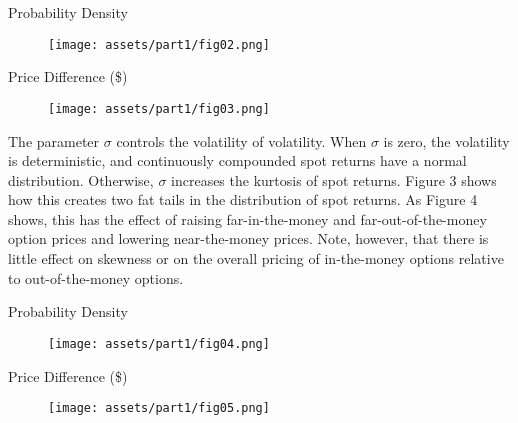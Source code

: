     \begin{frame}{Probability Density}
        \begin{figure}
            \texttt{[image: assets/part1/fig02.png]}
        \end{figure}
    \end{frame}
    
    \begin{frame}{Price Difference (\$)}
        \begin{figure}
            \texttt{[image: assets/part1/fig03.png]}
        \end{figure}
    \end{frame}

    \begin{frame}
        The parameter $\sigma$ controls the volatility of volatility. When $\sigma$ is zero, the volatility is deterministic, and continuously compounded spot returns have a normal distribution. Otherwise, $\sigma$ increases the kurtosis of spot returns. Figure 3 shows how this creates two fat tails in the distribution of spot returns. 
        As Figure 4 shows, this has the effect of raising far-in-the-money and far-out-of-the-money option prices and lowering near-the-money prices. Note, however, that there is little effect on skewness or on the overall pricing of in-the-money options relative to out-of-the-money options.
    \end{frame}

    \begin{frame}{Probability Density}
        \begin{figure}
            \texttt{[image: assets/part1/fig04.png]}
        \end{figure}
    \end{frame}

    \begin{frame}{Price Difference (\$)}
        \begin{figure}
            \texttt{[image: assets/part1/fig05.png]}
        \end{figure}
    \end{frame}